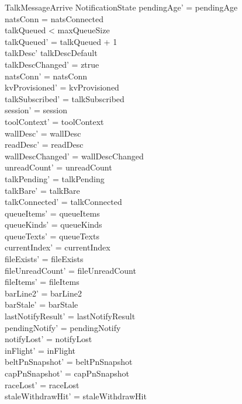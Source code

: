 \documentclass[a4paper,10pt,fleqn]{article}
\begin{document}
\begin{schema}{TalkMessageArrive}
  \Delta NotificationState
  \where
  pendingAge' = pendingAge \\
  natsConn = natsConnected \\
  talkQueued < maxQueueSize \\
  talkQueued' = talkQueued + 1 \\
  talkDesc' \neq talkDescDefault \\
  talkDescChanged' = ztrue \\
  natsConn' = natsConn \\
  kvProvisioned' = kvProvisioned \\
  talkSubscribed' = talkSubscribed \\
  session' = session \\
  toolContext' = toolContext \\
  wallDesc' = wallDesc \\
  readDesc' = readDesc \\
  wallDescChanged' = wallDescChanged \\
  unreadCount' = unreadCount \\
  talkPending' = talkPending \\
  talkBare' = talkBare \\
  talkConnected' = talkConnected \\
  queueItems' = queueItems \\
  queueKinds' = queueKinds \\
  queueTexts' = queueTexts \\
  currentIndex' = currentIndex \\
  fileExists' = fileExists \\
  fileUnreadCount' = fileUnreadCount \\
  fileItems' = fileItems \\
  barLine2' = barLine2 \\
  barStale' = barStale \\
  lastNotifyResult' = lastNotifyResult \\
  pendingNotify' = pendingNotify \\
  notifyLost' = notifyLost \\
  inFlight' = inFlight \\
  beltPnSnapshot' = beltPnSnapshot \\
  capPnSnapshot' = capPnSnapshot \\
  raceLost' = raceLost \\
  staleWithdrawHit' = staleWithdrawHit \\

\end{schema}
\end{document}
